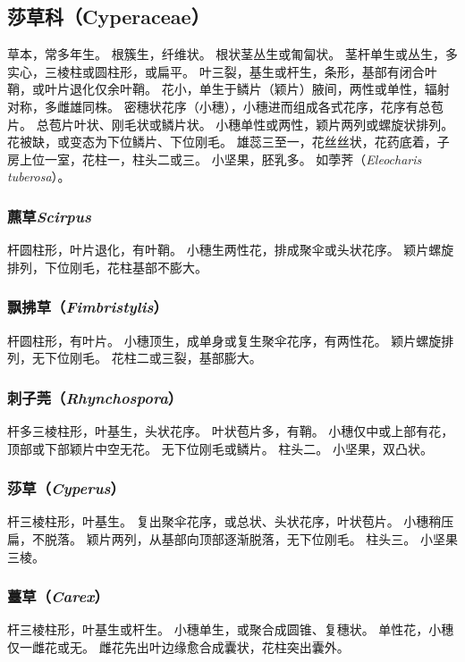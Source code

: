 \documentclass[11pt]{article}
\begin{document}
\begin{sloppypar}
\subsection{莎草科（Cyperaceae）}
草本，常多年生。
根簇生，纤维状。
根状茎丛生或匍匐状。
茎杆单生或丛生，多实心，三棱柱或圆柱形，或扁平。
叶三裂，基生或杆生，条形，基部有闭合叶鞘，或叶片退化仅余叶鞘。
花小，单生于鳞片（颖片）腋间，两性或单性，辐射对称，多雌雄同株。
密穗状花序（小穗），小穗进而组成各式花序，花序有总苞片。
总苞片叶状、刚毛状或鳞片状。
小穗单性或两性，颖片两列或螺旋状排列。
花被缺，或变态为下位鳞片、下位刚毛。
雄蕊三至一，花丝丝状，花药底着，子房上位一室，花柱一，柱头二或三。
小坚果，胚乳多。
如荸荠（\textit{Eleocharis tuberosa}）。

\subsubsection{藨草\textit{Scirpus}}
杆圆柱形，叶片退化，有叶鞘。
小穗生两性花，排成聚伞或头状花序。
颖片螺旋排列，下位刚毛，花柱基部不膨大。

\subsubsection{飘拂草（\textit{Fimbristylis}）}
杆圆柱形，有叶片。
小穗顶生，成单身或复生聚伞花序，有两性花。
颖片螺旋排列，无下位刚毛。
花柱二或三裂，基部膨大。

\subsubsection{刺子莞（\textit{Rhynchospora}）}
杆多三棱柱形，叶基生，头状花序。
叶状苞片多，有鞘。
小穗仅中或上部有花，顶部或下部颖片中空无花。
无下位刚毛或鳞片。
柱头二。
小坚果，双凸状。

\subsubsection{莎草（\textit{Cyperus}）}
杆三棱柱形，叶基生。
复出聚伞花序，或总状、头状花序，叶状苞片。
小穗稍压扁，不脱落。
颖片两列，从基部向顶部逐渐脱落，无下位刚毛。
柱头三。
小坚果三棱。

\subsubsection{薹草（\textit{Carex}）}
杆三棱柱形，叶基生或杆生。
小穗单生，或聚合成圆锥、复穗状。
单性花，小穗仅一雌花或无。
雌花先出叶边缘愈合成囊状，花柱突出囊外。


\end{sloppypar}
\end{document}
